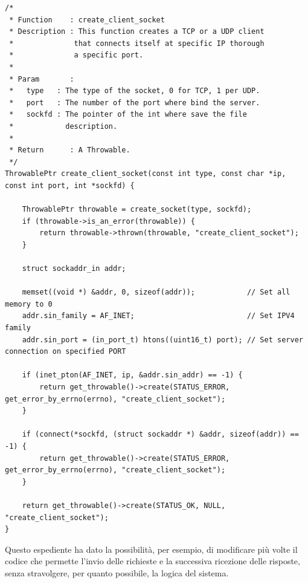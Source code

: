 \documentclass[italian]{tktltiki2}
\begin{document}
\begin{lstlisting}
/*
 * Function    : create_client_socket
 * Description : This function creates a TCP or a UDP client
 *              that connects itself at specific IP thorough
 *              a specific port.
 *
 * Param       :
 *   type   : The type of the socket, 0 for TCP, 1 per UDP.
 *   port   : The number of the port where bind the server.
 *   sockfd : The pointer of the int where save the file
 *            description.
 *
 * Return      : A Throwable.
 */
ThrowablePtr create_client_socket(const int type, const char *ip, const int port, int *sockfd) {

    ThrowablePtr throwable = create_socket(type, sockfd);
    if (throwable->is_an_error(throwable)) {
        return throwable->thrown(throwable, "create_client_socket");
    }

    struct sockaddr_in addr;

    memset((void *) &addr, 0, sizeof(addr));            // Set all memory to 0
    addr.sin_family = AF_INET;                          // Set IPV4 family
    addr.sin_port = (in_port_t) htons((uint16_t) port); // Set server connection on specified PORT

    if (inet_pton(AF_INET, ip, &addr.sin_addr) == -1) {
        return get_throwable()->create(STATUS_ERROR, get_error_by_errno(errno), "create_client_socket");
    }

    if (connect(*sockfd, (struct sockaddr *) &addr, sizeof(addr)) == -1) {
        return get_throwable()->create(STATUS_ERROR, get_error_by_errno(errno), "create_client_socket");
    }

    return get_throwable()->create(STATUS_OK, NULL, "create_client_socket");
}
\end{lstlisting}
Questo espediente ha dato la possibilità, per esempio, di modificare più volte il codice che permette l'invio delle richieste e la successiva ricezione delle risposte, senza stravolgere, per quanto possibile, la logica del sistema.
\end{document}
